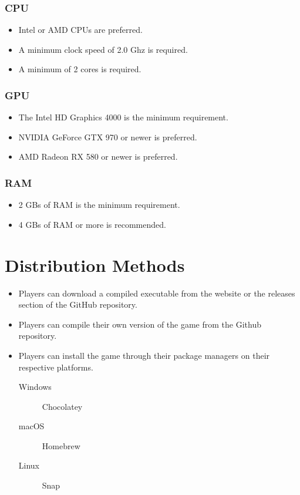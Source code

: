 \subsubsection{CPU}

\begin{itemize}
    \item Intel or AMD CPUs are preferred.
    \item A minimum clock speed of 2.0 Ghz is required.
    \item A minimum of 2 cores is required.
\end{itemize}

\subsubsection{GPU}

\begin{itemize}
    \item The Intel HD Graphics 4000 is the minimum requirement.
    \item NVIDIA GeForce GTX 970 or newer is preferred.
    \item AMD Radeon RX 580 or newer is preferred.
\end{itemize}

\subsubsection{RAM}

\begin{itemize}
    \item 2 GBs of RAM is the minimum requirement.
    \item 4 GBs of RAM or more is recommended.
\end{itemize}

\pagebreak

\section{Distribution Methods}

\begin{itemize}
    \item Players can download a compiled executable from the website or the releases section of the GitHub repository.
    \item Players can compile their own version of the game from the Github repository.
    \item Players can install the game through their package managers on their respective platforms.
    \begin{description}
        \item [Windows] Chocolatey
        \item [macOS] Homebrew
        \item [Linux] Snap
    \end{description}
\end{itemize}

